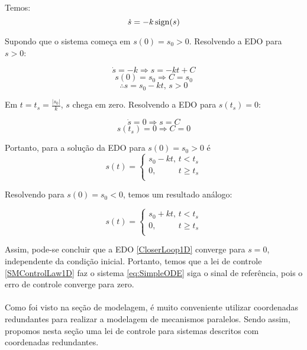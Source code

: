 Temos:
\begin{equation} \label{CloserLoop1D}
\dot{s} = -k \operatorname*{sign}(s) 
\end{equation}

Supondo que o sistema come\c{c}a em $s(0) = s_0 >0$. Resolvendo a EDO para $s>0$:

$$ \dot{s} = -k \Rightarrow s = -k t + C $$
$$ s(0) = s_0 \Rightarrow C = s_0 $$
$$ \therefore s = s_0 - k t, \, s>0 $$

Em $t = t_s = \frac{|s_0|}{k}$, $s$ chega em zero. Resolvendo a EDO para $s(t_s) = 0$:

$$ \dot{s} = 0 \Rightarrow s =  C $$
$$ s(t_s) = 0 \Rightarrow C = 0 $$

Portanto, para a solu\c{c}\~ao da EDO para $s(0) = s_0 > 0$ é
\begin{equation} \label{eq:SM-ODE-Sol1}
s(t) =
\begin{cases}
s_0 - k t, \, t < t_s \\
0, \,\,\,\,\,\,\,\,\,\,\,\,\,\,\,\, t \geq t_s \\
\end{cases}
\end{equation}

Resolvendo para $s(0) = s_0 < 0$, temos um resultado an\'alogo:

\begin{equation} \label{eq:SM-ODE-Sol2}
s(t) =
\begin{cases}
s_0 + k t, \, t < t_s \\
0, \,\,\,\,\,\,\,\,\,\,\,\,\,\,\,\, t \geq t_s \\
\end{cases}
\end{equation}

Assim, pode-se concluir que a EDO \eqref{CloserLoop1D} converge para $s=0$, independente da condi\c{c}\~ao inicial. Portanto, temos que a lei de controle \eqref{SMControlLaw1D} faz o sistema \eqref{eq:SimpleODE} siga o sinal de referência, pois o erro de controle converge para zero. \\

\\

Como foi visto na seção de modelagem, é muito conveniente utilizar coordenadas redundantes para realizar a modelagem de mecanismos paralelos. Sendo assim, propomos nesta seção uma lei de controle para sistemas descritos com coordenadas redundantes. \\
 
